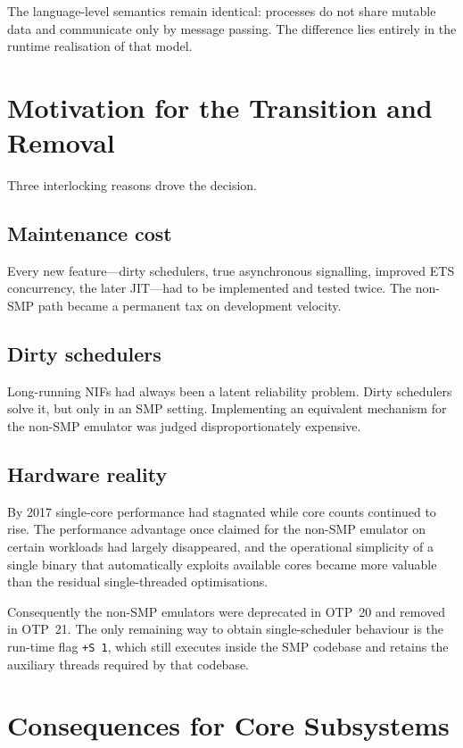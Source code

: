 \documentclass{article}
\begin{document}
The language-level semantics remain identical: processes do not share mutable data and communicate only by message passing.
The difference lies entirely in the runtime realisation of that model.

\section{Motivation for the Transition and Removal}

Three interlocking reasons drove the decision.

\subsection{Maintenance cost}

Every new feature---dirty schedulers, true asynchronous signalling, improved ETS concurrency, the later JIT---had to be implemented and tested twice.
The non-SMP path became a permanent tax on development velocity.

\subsection{Dirty schedulers}

Long-running NIFs had always been a latent reliability problem.
Dirty schedulers solve it, but only in an SMP setting.
Implementing an equivalent mechanism for the non-SMP emulator was judged disproportionately expensive.

\subsection{Hardware reality}

By 2017 single-core performance had stagnated while core counts continued to rise.
The performance advantage once claimed for the non-SMP emulator on certain workloads had largely disappeared, and the operational simplicity of a single binary that automatically exploits available cores became more valuable than the residual single-threaded optimisations.

Consequently the non-SMP emulators were deprecated in OTP~20 and removed in OTP~21.
The only remaining way to obtain single-scheduler behaviour is the run-time flag \texttt{+S 1}, which still executes inside the SMP codebase and retains the auxiliary threads required by that codebase.

\newpage
\section{Consequences for Core Subsystems}
\end{document}
